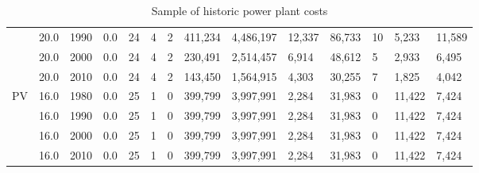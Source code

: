 \begin{table}[]
\begin{tabular}{|l|l|l|l|l|l|l|l|l|l|l|l|l|l|}
		& 20.0 & 1990 & 0.0 & 24 & 4 & 2 & 411,234 & 4,486,197 & 12,337 & 86,733 & 10 & 5,233 & 11,589 \\ \cline{2-14} 
		& 20.0 & 2000 & 0.0 & 24 & 4 & 2 & 230,491 & 2,514,457 & 6,914 & 48,612 & 5 & 2,933 & 6,495 \\ \cline{2-14} 
		& 20.0 & 2010 & 0.0 & 24 & 4 & 2 & 143,450 & 1,564,915 & 4,303 & 30,255 & 7 & 1,825 & 4,042 \\ \hline
		\multirow{4}{*}{PV} & 16.0 & 1980 & 0.0 & 25 & 1 & 0 & 399,799 & 3,997,991 & 2,284 & 31,983 & 0 & 11,422 & 7,424 \\ \cline{2-14} 
		& 16.0 & 1990 & 0.0 & 25 & 1 & 0 & 399,799 & 3,997,991 & 2,284 & 31,983 & 0 & 11,422 & 7,424 \\ \cline{2-14} 
		& 16.0 & 2000 & 0.0 & 25 & 1 & 0 & 399,799 & 3,997,991 & 2,284 & 31,983 & 0 & 11,422 & 7,424 \\ \cline{2-14} 
		& 16.0 & 2010 & 0.0 & 25 & 1 & 0 & 399,799 & 3,997,991 & 2,284 & 31,983 & 0 & 11,422 & 7,424 \\ \hline
	\end{tabular}
	\label{table:historic_plant_costs}
	\caption{Sample of historic power plant costs}
\end{table}
